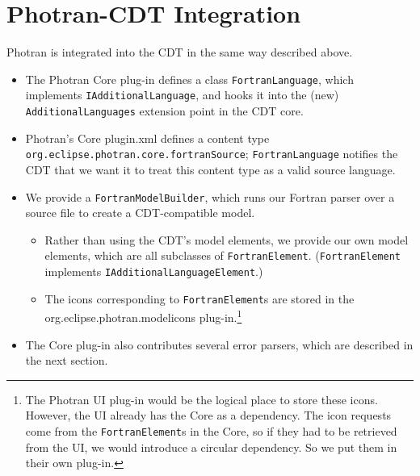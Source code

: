 \section{Photran-CDT Integration}

Photran is integrated into the CDT in the same way described above.
\begin{itemize}

\item The Photran Core plug-in
defines a class \texttt{FortranLanguage}, which implements
\texttt{IAdditionalLanguage}, and hooks it into the (new)
\texttt{AdditionalLanguages} extension point in the CDT core.

\item Photran's Core plugin.xml defines a content type
\texttt{org.eclipse.photran.core.fortranSource}; \texttt{FortranLanguage}
notifies the CDT that we want it to treat this content type as a valid
source language.

\item We provide a \texttt{FortranModelBuilder}, which
runs our Fortran parser over a source file to create a CDT-compatible
model.

\begin{itemize}

\item Rather than using the CDT's model elements, we provide our own
model elements, which are all subclasses of \texttt{FortranElement}.
(\texttt{FortranElement} implements \texttt{IAdditionalLanguageElement}.)

\item The icons corresponding to \texttt{FortranElement}s
are stored in the org.eclipse.photran.modelicons plug-in.\footnote{
The Photran UI plug-in would be the logical place to store these icons.
However, the UI already has the Core as a dependency.  The icon requests
come from the \texttt{FortranElement}s in the Core, so if they had to be
retrieved from the UI, we would introduce a circular dependency.  So we put
them in their own plug-in.}

\end{itemize}

\item The Core plug-in also contributes several error parsers,
which are described in the next section.

\end{itemize}
